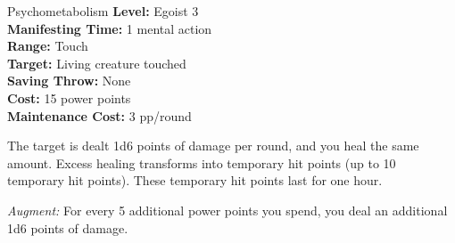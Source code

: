 {Psychometabolism}
{
	\textbf{Level:}
	Egoist 3\\
	\textbf{Manifesting Time:}
	1 mental action\\
	\textbf{Range:}
	Touch\\
	\textbf{Target:}
	Living creature touched\\
	\textbf{Saving Throw:}
	None\\
	\textbf{Cost:}
	15 power points\\
	\textbf{Maintenance Cost:}
	3 pp/round\\
}
{
	The target is dealt 1d6 points of damage per round, and you heal the same amount. Excess healing transforms into temporary hit points (up to 10 temporary hit points). These temporary hit points last for one hour.

	\textit{Augment:} For every 5 additional power points you spend, you deal an additional 1d6 points of damage.
}